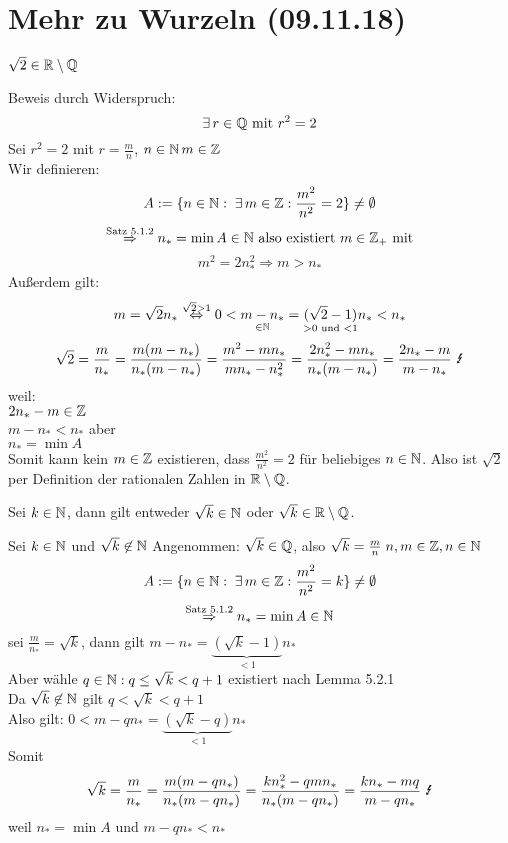 \documentclass[../ana1u.tex]{subfiles}
\begin{document}
\setcounter{section}{2}

\section{Mehr zu Wurzeln (09.11.18)}
\begin{bsp} [Exkurs]
    \begin{beh}
        \(\sqrt{2} \in \mathbb{R} \setminus \mathbb{Q}\)
    \end{beh}
    \begin{bew}
        Beweis durch Widerspruch:
        \[\exists \, r \in \mathbb{Q} \text{ mit } r^2 = 2\]
        Sei \(r^2 = 2\) mit \(r = \frac{m}{n}\), \(n \in \mathbb{N}\, m \in \mathbb{Z}\)\\
        Wir definieren:
        \[A := \{n \in \mathbb{N}: \; \exists \, m \in \mathbb{Z}: \frac{m^2}{n^2} = 2\} \neq \emptyset\]
        \[\overset{\text{Satz 5.1.2}}{\Rightarrow} n_* = \min A \in \mathbb{N} \text{ also existiert } m \in \mathbb{Z}_+ \text{ mit}\]
        \[m^2 = 2n_*^2 \Rightarrow m > n_* \]
        Außerdem gilt:
        \[m = \sqrt{2}n_* \overset{\sqrt{2} > 1}{\Leftrightarrow} 0 < \underset{\in \mathbb{N}}{m - n_*} = \underset{> 0 \text{ und } < 1}{(\sqrt{2} - 1)}n_* < n_*\]
        \[\sqrt{2} = \frac{m}{n_*} = \frac{m(m - n_*)}{n_*(m - n_*)} = \frac{m^2 - mn_*}{mn_* - n_*^2} = \frac{2n_*^2 - mn_*}{n_*(m-n_*)} = \frac{2n_*-m}{m-n_*} \text{ \Lightning}\]
        weil:\\
        \(2n_* - m \in \mathbb{Z}\)\\
        \(m - n_* < n_*\) aber\\
        \(n_* = \min A\)\\
        Somit kann kein \(m \in \mathbb{Z}\) existieren, dass \(\frac{m^2}{n^2} = 2\) für beliebiges \(n \in \mathbb{N}\). Also ist \(\sqrt{2}\) per Definition der rationalen Zahlen in \(\mathbb{R} \setminus \mathbb{Q}\).
    \end{bew}
    \begin{satz}
        Sei \(k \in \mathbb{N}\), dann gilt entweder \(\sqrt{k} \in \mathbb{N}\) oder \(\sqrt{k} \in \mathbb{R} \setminus \mathbb{Q}\).
    \end{satz}
    \begin{bew}
        Sei \(k \in \mathbb{N}\) und \(\sqrt{k} \not\in \mathbb{N} \) 
        Angenommen: \(\sqrt{k} \in \mathbb{Q}\), also \(\sqrt{k} = \frac{m}{n} \; n,m \in \mathbb{Z}, 
        n \in \mathbb{N}\)
        \[A := \{n \in \mathbb{N}: \; \exists \, m \in \mathbb{Z}: \frac{m^2}{n^2} = k\} \neq \emptyset\]
        \[\overset{\text{Satz 5.1.2}}{\Rightarrow} n_* = \min A \in \mathbb{N}\]
        sei \(\frac{m}{n_*} = \sqrt{k}\), dann gilt \(m - n_* = \underbrace{(\sqrt{k}-1)}_{<1}n_*\)\\
        Aber wähle \(q \in \mathbb{N}: q \leq \sqrt{k} < q + 1\) existiert nach Lemma 5.2.1\\
        Da \(\sqrt{k} \not \in \mathbb{N}\) gilt \(q < \sqrt{k} < q + 1\)\\
        Also gilt: \(0 < m - qn_* = \underbrace{(\sqrt{k}-q)}_{<1}n_*\)\\
        Somit
        \[\sqrt{k} = \frac{m}{n_*} = \frac{m(m - qn_*)}{n_*(m - qn_*)} = \frac{kn_*^2 - qmn_*}{n_*(m-qn_*)} = \frac{kn_* - mq}{m - qn_*} \text{ \Lightning}\]
        weil \(n_* = \min A\) und \(m - qn_* < n_*\)
    \end{bew}
\end{bsp}
\end{document}
